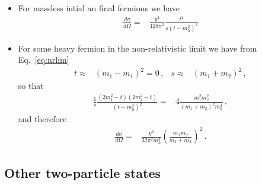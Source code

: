 \begin{itemize}
\item For massless intial an final fermions we have
\begin{align}
    \frac{d\sigma}{d\Omega}
=&\frac{y^4}{128\pi^2}\frac{t^2}{s\left(t-m^2_h\right)^2}
\end{align}
\item For some heavy fermion in the non-relativistic limit we have
  from Eq.~\eqref{eq:nrlim}
\begin{align}
  t\approx& (m_1-m_1)^2=0\,,& 
  s\approx& (m_1+m_2)^2\,,
\end{align}
so that
\begin{align*}
\frac{1}{s}  \frac{ \left(2m_1^2-t  \right)\left( 2m_2^2-t \right)}{\left(t-m^2_h\right)^2}=& 4\frac{m_1^2m_2^2}{\left( m_1+m_2\right)^2m_h^4}\,,
\end{align*}
and therefore
\begin{align}
  \label{eq:mhff}
      \frac{d\sigma}{d\Omega}
=&\frac{y^4}{32\pi^2m_h^4}\left(\frac{m_1m_2}{m_1+m_2}\right)^2\,.
\end{align}

\end{itemize}

\subsection{Other two-particle states}

